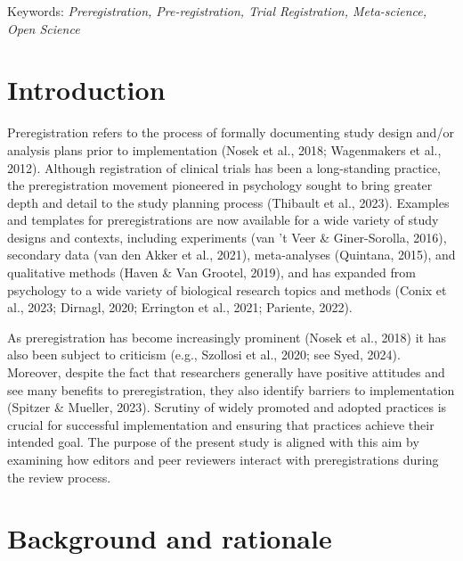 \documentclass[authordate, empirical]{jote-new-article}
\begin{document}
	Keywords: \emph{Preregistration, Pre-registration, Trial Registration, Meta-science, Open Science}







	\section{\textbf{Introduction}}



	Preregistration refers to the process of formally documenting study design and/or analysis plans prior to implementation (Nosek et al., 2018; Wagenmakers et al., 2012). Although registration of clinical trials has been a long-standing practice, the preregistration movement pioneered in psychology sought to bring greater depth and detail to the study planning process (Thibault et al., 2023). Examples and templates for preregistrations are now available for a wide variety of study designs and contexts, including experiments (van 't Veer \& Giner-Sorolla, 2016), secondary data (van den Akker et al., 2021), meta-analyses (Quintana, 2015), and qualitative methods (Haven \& Van Grootel, 2019), and has expanded from psychology to a wide variety of biological research topics and methods (Conix et al., 2023; Dirnagl, 2020; Errington et al., 2021; Pariente, 2022).



	As preregistration has become increasingly prominent (Nosek et al., 2018) it has also been subject to criticism (e.g., Szollosi et al., 2020; see Syed, 2024). Moreover, despite the fact that researchers generally have positive attitudes and see many benefits to preregistration, they also identify barriers to implementation (Spitzer \& Mueller, 2023). Scrutiny of widely promoted and adopted practices is crucial for successful implementation and ensuring that practices achieve their intended goal. The purpose of the present study is aligned with this aim by examining how editors and peer reviewers interact with preregistrations during the review process.



	\section{\textbf{Background and rationale}}
\end{document}
